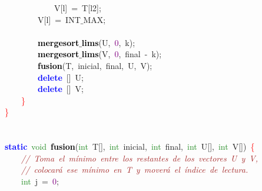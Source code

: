\mbox{}\ \ \ \ \ \ \ \ \ \ \ \ V\textcolor{BrickRed}{[}l\textcolor{BrickRed}{]}\ \textcolor{BrickRed}{=}\ T\textcolor{BrickRed}{[}l2\textcolor{BrickRed}{];} \\
\mbox{}\ \ \ \ \ \ \ \ V\textcolor{BrickRed}{[}l\textcolor{BrickRed}{]}\ \textcolor{BrickRed}{=}\ INT$\_$MAX\textcolor{BrickRed}{;} \\
\mbox{}\ \ \ \ \ \ \ \  \\
\mbox{}\ \ \ \ \ \ \ \ \textbf{\textcolor{Black}{mergesort$\_$lims}}\textcolor{BrickRed}{(}U\textcolor{BrickRed}{,}\ \textcolor{Purple}{0}\textcolor{BrickRed}{,}\ k\textcolor{BrickRed}{);} \\
\mbox{}\ \ \ \ \ \ \ \ \textbf{\textcolor{Black}{mergesort$\_$lims}}\textcolor{BrickRed}{(}V\textcolor{BrickRed}{,}\ \textcolor{Purple}{0}\textcolor{BrickRed}{,}\ final\ \textcolor{BrickRed}{-}\ k\textcolor{BrickRed}{);} \\
\mbox{}\ \ \ \ \ \ \ \ \textbf{\textcolor{Black}{fusion}}\textcolor{BrickRed}{(}T\textcolor{BrickRed}{,}\ inicial\textcolor{BrickRed}{,}\ final\textcolor{BrickRed}{,}\ U\textcolor{BrickRed}{,}\ V\textcolor{BrickRed}{);} \\
\mbox{}\ \ \ \ \ \ \ \ \textbf{\textcolor{Blue}{delete}}\ \textcolor{BrickRed}{[]}\ U\textcolor{BrickRed}{;} \\
\mbox{}\ \ \ \ \ \ \ \ \textbf{\textcolor{Blue}{delete}}\ \textcolor{BrickRed}{[]}\ V\textcolor{BrickRed}{;} \\
\mbox{}\ \ \ \ \textcolor{Red}{\}} \\
\mbox{}\textcolor{Red}{\}} \\
\mbox{} \\
\mbox{} \\
\mbox{}\textbf{\textcolor{Blue}{static}}\ \textcolor{ForestGreen}{void}\ \textbf{\textcolor{Black}{fusion}}\textcolor{BrickRed}{(}\textcolor{ForestGreen}{int}\ T\textcolor{BrickRed}{[],}\ \textcolor{ForestGreen}{int}\ inicial\textcolor{BrickRed}{,}\ \textcolor{ForestGreen}{int}\ final\textcolor{BrickRed}{,}\ \textcolor{ForestGreen}{int}\ U\textcolor{BrickRed}{[],}\ \textcolor{ForestGreen}{int}\ V\textcolor{BrickRed}{[])}\ \textcolor{Red}{\{} \\
\mbox{}\ \ \ \ \textit{\textcolor{Brown}{//\ Toma\ el\ mínimo\ entre\ los\ restantes\ de\ los\ vectores\ U\ y\ V,}} \\
\mbox{}\ \ \ \ \textit{\textcolor{Brown}{//\ colocará\ ese\ mínimo\ en\ T\ y\ moverá\ el\ índice\ de\ lectura.}} \\
\mbox{}\ \ \ \ \textcolor{ForestGreen}{int}\ j\ \textcolor{BrickRed}{=}\ \textcolor{Purple}{0}\textcolor{BrickRed}{;} \\
